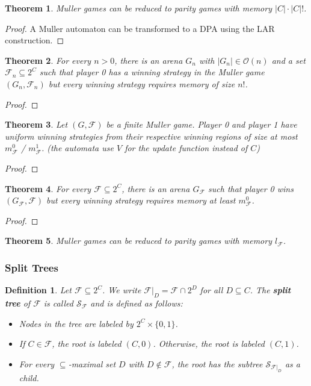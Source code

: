 \documentclass{article}
\newtheorem{theorem}{Theorem}
\newtheorem{definition}{Definition}
\begin{document}
\begin{theorem}
	Muller games can be reduced to parity games with memory $|C| \cdot |C|!$.
\end{theorem}
\begin{proof}
	A Muller automaton can be transformed to a DPA using the LAR construction.
\end{proof}

\begin{theorem}
	For every $n > 0$, there is an arena $G_n$ with $|G_n| \in \mathcal{O}(n)$ and a set $\mathcal{F}_n \subseteq 2^C$ such that player 0 has a winning strategy in the Muller game $(G_n, \mathcal{F}_n)$ but every winning strategy requires memory of size $n!$.
\end{theorem}
\begin{proof}
\end{proof}

\begin{theorem}
	Let $(G, \mathcal{F})$ be a finite Muller game. Player 0 and player 1 have uniform winning strategies from their respective winning regions of size at most $m^0_\mathcal{F}$ / $m^1_\mathcal{F}$. (the automata use $V$ for the update function instead of $C$)
\end{theorem}
\begin{proof}
\end{proof}

\begin{theorem}
	For every $\mathcal{F} \subseteq 2^C$, there is an arena $G_\mathcal{F}$ such that player 0 wins $(G_\mathcal{F}, \mathcal{F})$ but every winning strategy requires memory at least $m^0_\mathcal{F}$.
\end{theorem}
\begin{proof}
\end{proof}

\begin{theorem}
	Muller games can be reduced to parity games with memory $l_\mathcal{F}$.
\end{theorem}

\subsubsection{Split Trees}
\begin{definition}
	Let $\mathcal{F} \subseteq 2^C$. We write $\mathcal{F}|_D = \mathcal{F} \cap 2^D$ for all $D \subseteq C$. The \textbf{split tree} of $\mathcal{F}$ is called $\mathcal{S}_\mathcal{F}$ and is defined as follows: 
	\begin{itemize}
		\item Nodes in the tree are labeled by $2^C \times \{0,1\}$.
		\item If $C \in \mathcal{F}$, the root is labeled $(C, 0)$. Otherwise, the root is labeled $(C, 1)$.
		\item For every $\subseteq$-maximal set $D$ with $D \notin \mathcal{F}$, the root has the subtree $\mathcal{S}_{\mathcal{F}|_D}$ as a child.
	\end{itemize}
\end{definition}
\end{document}
